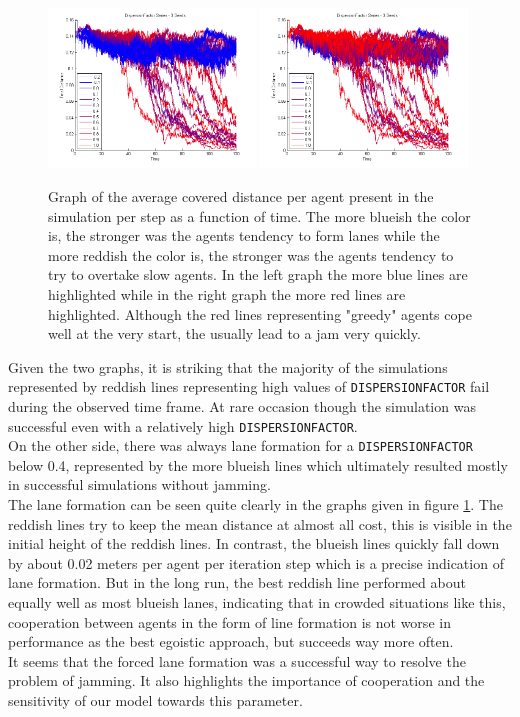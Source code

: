 \begin{figure}[h!]
	\centering
		\includegraphics[width=0.49\textwidth]{pictures/AAllInOneColorsBlue.png}
		\includegraphics[width=0.49\textwidth]{pictures/AAllInOneColorsRed.png}
	\caption{Graph of the average covered distance per agent present in the simulation per step as a function of time. The more blueish the color is, the stronger was the agents tendency to form lanes while the more reddish the color is, the stronger was the agents tendency to try to overtake slow agents. In the left graph the more blue lines are highlighted while in the right graph the more red lines are highlighted. Although the red lines representing "greedy" agents cope well at the very start, the usually lead to a jam very quickly.}
	\label{fig:AAllInOne}
\end{figure}

\noi Given the two graphs, it is striking that the majority of the simulations represented by reddish lines representing high values of \texttt{DISPERSIONFACTOR} fail during the observed time frame. At rare occasion though the simulation was successful even with a relatively high \texttt{DISPERSIONFACTOR}.\\
On the other side, there was always lane formation for a \texttt{DISPERSIONFACTOR} below 0.4, represented by the more blueish lines which ultimately resulted mostly in successful simulations without jamming.\\
The lane formation can be seen quite clearly in the graphs given in figure \ref{fig:AAllInOne}. The reddish lines try to keep the mean distance at almost all cost, this is visible in the initial height of the reddish lines. In contrast, the blueish lines quickly fall down by about 0.02 meters per agent per iteration step which is a precise indication of lane formation. But in the long run, the best reddish line performed about equally well as most blueish lanes, indicating that in crowded situations like this, cooperation between agents in the form of line formation is not worse in performance as the best egoistic approach, but succeeds way more often.\\

\noi It seems that the forced lane formation was a successful way to resolve the problem of jamming. It also highlights the importance of cooperation and the sensitivity of our model towards this parameter.

